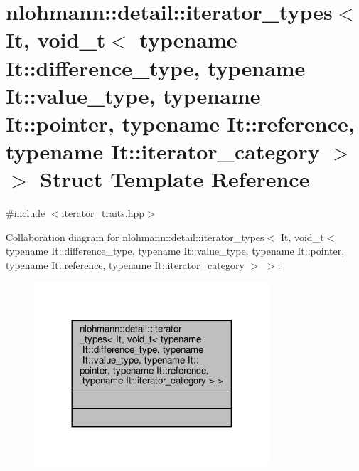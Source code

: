 \hypertarget{structnlohmann_1_1detail_1_1iterator__types_3_01_it_00_01void__t_3_01typename_01_it_1_1differenc4a413e9bd546446175f10f15c5631361}{}\section{nlohmann\+:\+:detail\+:\+:iterator\+\_\+types$<$ It, void\+\_\+t$<$ typename It\+:\+:difference\+\_\+type, typename It\+:\+:value\+\_\+type, typename It\+:\+:pointer, typename It\+:\+:reference, typename It\+:\+:iterator\+\_\+category $>$ $>$ Struct Template Reference}
\label{structnlohmann_1_1detail_1_1iterator__types_3_01_it_00_01void__t_3_01typename_01_it_1_1differenc4a413e9bd546446175f10f15c5631361}


{\ttfamily \#include $<$iterator\+\_\+traits.\+hpp$>$}



Collaboration diagram for nlohmann\+:\+:detail\+:\+:iterator\+\_\+types$<$ It, void\+\_\+t$<$ typename It\+:\+:difference\+\_\+type, typename It\+:\+:value\+\_\+type, typename It\+:\+:pointer, typename It\+:\+:reference, typename It\+:\+:iterator\+\_\+category $>$ $>$\+:
\nopagebreak
\begin{figure}[H]
\begin{center}
\leavevmode
\includegraphics[width=248pt]{structnlohmann_1_1detail_1_1iterator__types_3_01_it_00_01void__t_3_01typename_01_it_1_1difference0d7446cd318cd8f58dd0f206494d7bb}
\end{center}
\end{figure}
